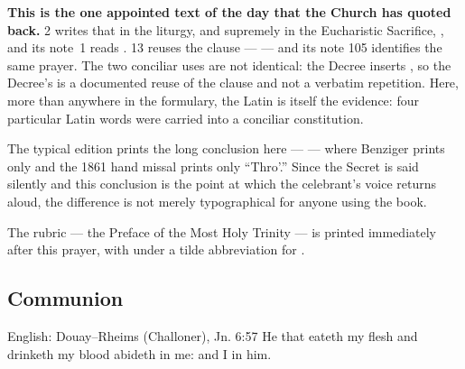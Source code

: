 \textbf{This is the one appointed text of the day that the Church has quoted
back.}  2 writes that in the liturgy, and
supremely in the Eucharistic Sacrifice, , and its note~1 reads .  13 reuses the
clause ---  --- and its note 105 identifies the same prayer. The two conciliar
uses are not identical: the Decree inserts , so the Decree's
is a documented reuse of the clause and not a verbatim repetition. Here, more
than anywhere in the formulary, the Latin is itself the evidence: four particular Latin words
were carried into a conciliar constitution.

The typical edition prints the long conclusion here ---  ---
where Benziger prints only  and the 1861 hand missal prints
only ``Thro'.'' Since the Secret is said silently and this conclusion is the
point at which the celebrant's voice returns aloud, the difference is not
merely typographical for anyone using the book.

The rubric  --- the Preface of the Most Holy
Trinity --- is printed immediately after this prayer, with  under
a tilde abbreviation for .

\elementguard
\subsection*{Communion }


\begin{namedtranslation}{English: Douay--Rheims (Challoner), Jn. 6:57}
He that eateth my flesh and drinketh my blood abideth in me: and I in him.
\end{namedtranslation}


